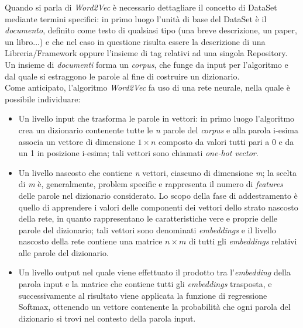 Quando si parla di \emph{Word2Vec} è necessario dettagliare il concetto di DataSet mediante termini specifici: in primo luogo l'unità di base del DataSet è il \emph{documento}, definito come testo di qualsiasi tipo (una breve descrizione, un paper, un libro...) e che nel caso in questione risulta essere la descrizione di una Libreria/Framework oppure l'insieme di tag relativi ad una singola Repository. Un insieme di \emph{documenti} forma un \emph{corpus}, che funge da input per l'algoritmo e dal quale si estraggono le parole al fine di costruire un dizionario.\\
Come anticipato, l'algoritmo \emph{Word2Vec} fa uso di una rete neurale, nella quale è possibile individuare:
\begin{itemize}
    \item Un livello input che trasforma le parole in vettori: in primo luogo l'algoritmo crea un dizionario contenente tutte le \emph{n} parole del \emph{corpus} e alla parola i-esima associa un vettore di dimensione \emph{$1\times n$} composto da valori tutti pari a 0 e da un 1 in posizione i-esima; tali vettori sono chiamati \emph{one-hot vector}. 
    \item Un livello nascosto che contiene \emph{n} vettori, ciascuno di dimensione \emph{m}; la scelta di \emph{m} è, generalmente, problem specific e rappresenta il numero di \emph{features} delle parole nel dizionario considerato. Lo scopo della fase di addestramento è quello di apprendere i valori delle componenti dei vettori dello strato nascosto della rete, in quanto rappresentano le caratteristiche vere e proprie delle parole del dizionario; tali vettori sono denominati \emph{embeddings} e il livello nascosto della rete contiene una matrice \emph{$n \times m$} di tutti gli \emph{embeddings} relativi alle parole del dizionario.
    \item Un livello output nel quale viene effettuato il prodotto tra l'\emph{embedding} della parola input e la matrice che contiene tutti gli \emph{embeddings} trasposta, e successivamente al risultato viene applicata la funzione di regressione Softmax, ottenendo un vettore contenente la probabilità che ogni parola del dizionario si trovi nel contesto della parola input.
\end{itemize} 
